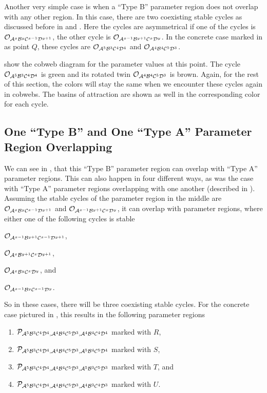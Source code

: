 Another very simple case is when a ``Type B'' parameter region does not overlap with any other region.
In this case, there are two coexisting stable cycles as discussed before in  and .
Here the cycles are asymmetrical if one of the cycles is $\mathcal{O}_{\mathcal{A}^x\mathcal{B}^y\mathcal{C}^{x-1}\mathcal{D}^{y+1}}$, the other cycle is $\mathcal{O}_{\mathcal{A}^{x-1}\mathcal{B}^{y+1}\mathcal{C}^x\mathcal{D}^y}$.
In the concrete case marked in  as point $Q$, these cycles are $\mathcal{O}_{\mathcal{A}^5\mathcal{B}^3\mathcal{C}^4\mathcal{D}^4}$ and $\mathcal{O}_{\mathcal{A}^4\mathcal{B}^4\mathcal{C}^5\mathcal{D}^3}$.

 show the cobweb diagram for the parameter values at this point.
The cycle $\mathcal{O}_{\mathcal{A}^5\mathcal{B}^3\mathcal{C}^4\mathcal{D}^4}$ is green and its rotated twin $\mathcal{O}_{\mathcal{A}^4\mathcal{B}^4\mathcal{C}^5\mathcal{D}^3}$ is brown.
Again, for the rest of this section, the colors will stay the same when we encounter these cycles again in cobwebs.
The basins of attraction are shown as well in the corresponding color for each cycle.

\subsection{One ``Type B'' and One ``Type A'' Parameter Region Overlapping}
\label{sec:minrep.coex.BA}

We can see in , that this ``Type B'' parameter region can overlap with ``Type A'' parameter regions.
This can also happen in four different ways, as was the case with ``Type A'' parameter regions overlapping with one another (described in ).
Assuming the stable cycles of the parameter region in the middle are $\mathcal{O}_{\mathcal{A}^x\mathcal{B}^y\mathcal{C}^{x-1}\mathcal{D}^{y+1}}$ and $\mathcal{O}_{\mathcal{A}^{x-1}\mathcal{B}^{y+1}\mathcal{C}^x\mathcal{D}^y}$, it can overlap with parameter regions, where either one of the following cycles is stable
\begin{enumerate*}
	\item $\mathcal{O}_{\mathcal{A}^{x-1}\mathcal{B}^{y+1}\mathcal{C}^{x-1}\mathcal{D}^{y+1}}$,
	\item $\mathcal{O}_{\mathcal{A}^x\mathcal{B}^{y+1}\mathcal{C}^x\mathcal{D}^{y+1}}$,
	\item $\mathcal{O}_{\mathcal{A}^x\mathcal{B}^y\mathcal{C}^x\mathcal{D}^y}$, and
	\item $\mathcal{O}_{\mathcal{A}^{x-1}\mathcal{B}^y\mathcal{C}^{x-1}\mathcal{D}^y}$.
\end{enumerate*}
So in these cases, there will be three coexisting stable cycles.
For the concrete case pictured in , this results in the following parameter regions
\begin{enumerate}
	\item $\mathcal{P}_{\mathcal{A}^5\mathcal{B}^3\mathcal{C}^4\mathcal{D}^4, \mathcal{A}^4\mathcal{B}^4\mathcal{C}^5\mathcal{D}^3, \mathcal{A}^4\mathcal{B}^4\mathcal{C}^4\mathcal{D}^4}$ marked with $R$,
	\item $\mathcal{P}_{\mathcal{A}^5\mathcal{B}^3\mathcal{C}^4\mathcal{D}^4, \mathcal{A}^4\mathcal{B}^4\mathcal{C}^5\mathcal{D}^3, \mathcal{A}^5\mathcal{B}^4\mathcal{C}^5\mathcal{D}^4}$ marked with $S$,
	\item $\mathcal{P}_{\mathcal{A}^5\mathcal{B}^3\mathcal{C}^4\mathcal{D}^4, \mathcal{A}^4\mathcal{B}^4\mathcal{C}^5\mathcal{D}^3, \mathcal{A}^5\mathcal{B}^3\mathcal{C}^5\mathcal{D}^3}$ marked with $T$, and
	\item $\mathcal{P}_{\mathcal{A}^5\mathcal{B}^3\mathcal{C}^4\mathcal{D}^4, \mathcal{A}^4\mathcal{B}^4\mathcal{C}^5\mathcal{D}^3, \mathcal{A}^4\mathcal{B}^3\mathcal{C}^4\mathcal{D}^3}$ marked with $U$.
\end{enumerate}

